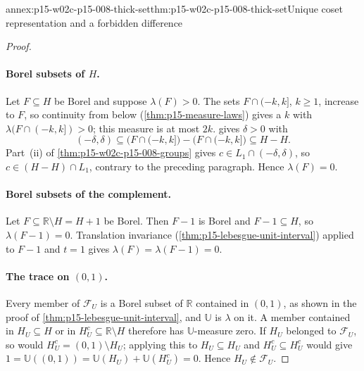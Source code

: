 \begin{annexitem}{annex:p15-w02c-p15-008-thick-set}{thm:p15-w02c-p15-008-thick-set}{Unique coset representation and a forbidden difference}
\begin{proof}
\paragraph{Borel subsets of \(H\).}
Let \(F\subseteq H\) be Borel and suppose \(\lambda(F)>0\). The sets
\(F\cap(-k,k]\), \(k\geq1\), increase to \(F\), so continuity from below
(\cref{thm:p15-measure-laws}) gives a \(k\) with
\(\lambda(F\cap(-k,k])>0\); this measure is at most \(2k\).
 gives \(\delta>0\) with
\[
 (-\delta,\delta)\subseteq\bigl(F\cap(-k,k]\bigr)-\bigl(F\cap(-k,k]\bigr)
                \subseteq H-H .
\]
Part~(ii) of \cref{thm:p15-w02c-p15-008-groups} gives
\(c\in L_1\cap(-\delta,\delta)\), so \(c\in(H-H)\cap L_1\), contrary to
the preceding paragraph. Hence \(\lambda(F)=0\).

\paragraph{Borel subsets of the complement.}
Let \(F\subseteq\mathbb R\setminus H=H+1\) be Borel. Then \(F-1\) is
Borel and \(F-1\subseteq H\), so \(\lambda(F-1)=0\). Translation
invariance (\cref{thm:p15-lebesgue-unit-interval}) applied to \(F-1\) and
\(t=1\) gives \(\lambda(F)=\lambda(F-1)=0\).

\paragraph{The trace on \((0,1)\).}
Every member of \(\mathcal F_U\) is a Borel subset of \(\mathbb R\)
contained in \((0,1)\), as shown in the proof of
\cref{thm:p15-lebesgue-unit-interval}, and \(\mathbb U\) is \(\lambda\)
on it. A member contained in \(H_U\subseteq H\) or in
\(H_U^c\subseteq\mathbb R\setminus H\) therefore has \(\mathbb U\)-measure
zero. If \(H_U\) belonged to \(\mathcal F_U\), so would
\(H_U^c=(0,1)\setminus H_U\); applying this to \(H_U\subseteq H_U\) and
\(H_U^c\subseteq H_U^c\) would give
\(1=\mathbb U((0,1))=\mathbb U(H_U)+\mathbb U(H_U^c)=0\). Hence
\(H_U\notin\mathcal F_U\).
\end{proof}
\end{annexitem}

